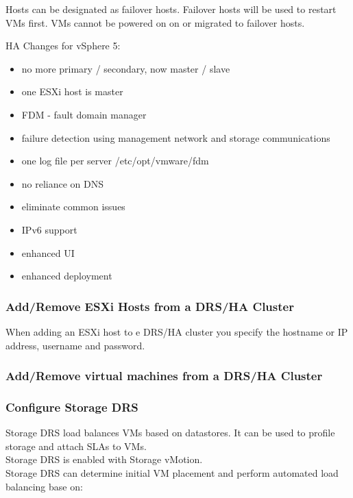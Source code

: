 Hosts can be designated as failover hosts. Failover hosts will be used to
restart VMs first. VMs cannot be powered on on or migrated to failover hosts.

HA Changes for vSphere 5:

\begin{itemize}

\item no more primary / secondary, now master / slave
\item one ESXi host is master
\item FDM - fault domain manager
\item failure detection using management network and storage communications
\item one log file per server /etc/opt/vmware/fdm
\item no reliance on DNS
\item eliminate common issues
\item IPv6 support
\item enhanced UI
\item enhanced deployment

\end{itemize}

\subsubsection{Add/Remove ESXi Hosts from a DRS/HA Cluster}

When adding an ESXi host to e DRS/HA cluster you specify the hostname or
IP address, username and password.

\subsubsection{Add/Remove virtual machines from a DRS/HA Cluster}

\subsubsection{Configure Storage DRS}

Storage DRS load balances VMs based on datastores. It can be used to profile
storage and attach SLAs to VMs.\\

Storage DRS is enabled with Storage vMotion.\\

Storage DRS can determine initial VM placement and perform automated load
balancing base on:


